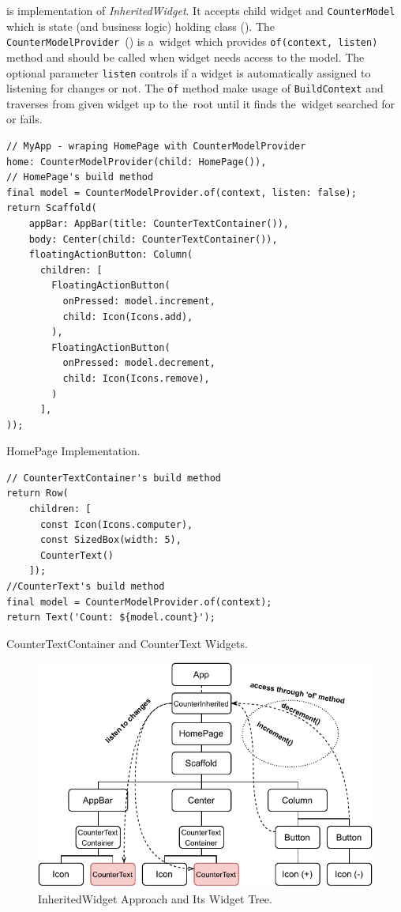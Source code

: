  is implementation of \textit{InheritedWidget}. It accepts child widget and \verb|CounterModel| which is state (and business logic) holding class (). The \verb|CounterModelProvider|~() is a~widget which provides \verb|of(context, listen)| method and should be called when widget needs access to the model. The optional parameter \verb|listen| controls if a widget is automatically assigned to listening for changes or not. The \verb|of| method make usage of \verb|BuildContext| and traverses from given widget up to the~root until it finds the~widget searched for or fails. 

\begin{listing}[ht]
\begin{verbatim}
// MyApp - wraping HomePage with CounterModelProvider
home: CounterModelProvider(child: HomePage()),
// HomePage's build method
final model = CounterModelProvider.of(context, listen: false);
return Scaffold(
    appBar: AppBar(title: CounterTextContainer()),
    body: Center(child: CounterTextContainer()),
    floatingActionButton: Column(
      children: [
        FloatingActionButton(
          onPressed: model.increment,
          child: Icon(Icons.add),
        ),
        FloatingActionButton(
          onPressed: model.decrement,
          child: Icon(Icons.remove),
        )
      ],
));
\end{verbatim}
\caption{HomePage Implementation.}
\label{listing:counter-inherited-homepage}
\end{listing}

\begin{listing}[ht]
\begin{verbatim}
// CounterTextContainer's build method
return Row(
    children: [
      const Icon(Icons.computer),
      const SizedBox(width: 5),
      CounterText()
    ]);
//CounterText's build method
final model = CounterModelProvider.of(context);
return Text('Count: ${model.count}');
\end{verbatim}
\caption{CounterTextContainer and CounterText Widgets.}
\label{listing:counter-inherited-text-container}
\end{listing}

\begin{figure}[htp]
    \centering
    \includegraphics[width=0.75\linewidth]{img/flutter/counter-inherited-widget.pdf}
    \caption{InheritedWidget Approach and Its Widget Tree.}
    \label{fig:counter-app-inherited-widget}
\end{figure}

